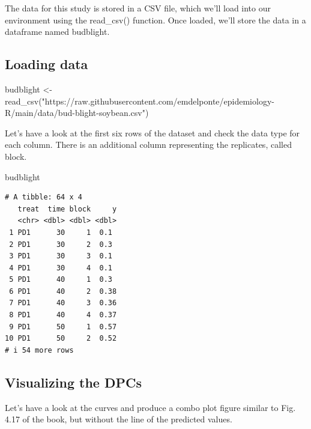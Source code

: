 \documentclass[
  letterpaper,
]{book}
\newenvironment{Shaded}{\begin{snugshade}}{\end{snugshade}}
\newcommand{\FunctionTok}[1]{\textcolor[rgb]{0.28,0.35,0.67}{#1}}
\newcommand{\NormalTok}[1]{\textcolor[rgb]{0.00,0.23,0.31}{#1}}
\newcommand{\OtherTok}[1]{\textcolor[rgb]{0.00,0.23,0.31}{#1}}
\newcommand{\StringTok}[1]{\textcolor[rgb]{0.13,0.47,0.30}{#1}}
\begin{document}
The data for this study is stored in a CSV file, which we'll load into
our environment using the read\_csv() function. Once loaded, we'll store
the data in a dataframe named budblight.

\hypertarget{loading-data}{%
\subsection{Loading data}\label{loading-data}}

\begin{Shaded}
\begin{Highlighting}[]
\NormalTok{budblight }\OtherTok{\textless{}{-}} \FunctionTok{read\_csv}\NormalTok{(}\StringTok{"https://raw.githubusercontent.com/emdelponte/epidemiology{-}R/main/data/bud{-}blight{-}soybean.csv"}\NormalTok{)}
\end{Highlighting}
\end{Shaded}

Let's have a look at the first six rows of the dataset and check the
data type for each column. There is an additional column representing
the replicates, called block.

\begin{Shaded}
\begin{Highlighting}[]
\NormalTok{budblight}
\end{Highlighting}
\end{Shaded}

\begin{verbatim}
# A tibble: 64 x 4
   treat  time block     y
   <chr> <dbl> <dbl> <dbl>
 1 PD1      30     1  0.1 
 2 PD1      30     2  0.3 
 3 PD1      30     3  0.1 
 4 PD1      30     4  0.1 
 5 PD1      40     1  0.3 
 6 PD1      40     2  0.38
 7 PD1      40     3  0.36
 8 PD1      40     4  0.37
 9 PD1      50     1  0.57
10 PD1      50     2  0.52
# i 54 more rows
\end{verbatim}

\hypertarget{visualizing-the-dpcs}{%
\subsection{Visualizing the DPCs}\label{visualizing-the-dpcs}}

Let's have a look at the curves and produce a combo plot figure similar
to Fig. 4.17 of the book, but without the line of the predicted values.
\end{document}
